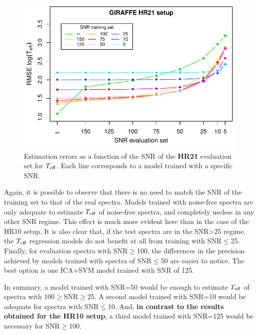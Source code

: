 \documentclass[a4paper,fleqn,usenatbib]{mnras}
\begin{document}
{{{\begin{figure}
	\centering\includegraphics[width=\columnwidth]{snr_errors_log_global_HR21.pdf}
	\caption{Estimation errors as a function of the SNR of the {\bf HR21} evaluation 
		set for $T_{\rm eff}$. Each line corresponds 
		to a model trained with a specific SNR.}
	\label{fig:snrtrainhr21}
\end{figure}

Again, it is possible to observe that there is no need to match 
the SNR of the training set to that of the real spectra. Models 
trained with noise-free spectra are only adequate to 
estimate $T_{\rm eff}$ of noise-free spectra, and completely 
useless in any other SNR regime. This effect is much more evident 
here than in the case of the HR10 setup. It is also clear that, if 
the test spectra are in the SNR>25 regime, the $T_{\rm eff}$ 
regression models do not benefit at all from training with SNR$\le$25.
Finally, for evaluation spectra with SNR$\ge$100, the differences 
in the precision achieved by models trained with spectra of 
SNR$\le$50 are easier to notice. The best 
option is one ICA+SVM model trained with SNR of 125.

In summary, a model trained with SNR=50 would be enough to 
estimate $T_{\rm eff}$ of spectra with 100$\ge$SNR$\ge$25. A 
second model trained with SNR=10 would be adequate for spectra 
with SNR$\le$10. And, {\bf in contrast to the results obtained 
for the HR10 setup}, a third model trained with SNR=125 would 
be necessary for SNR$\ge$100. 


}}}
\end{document}
